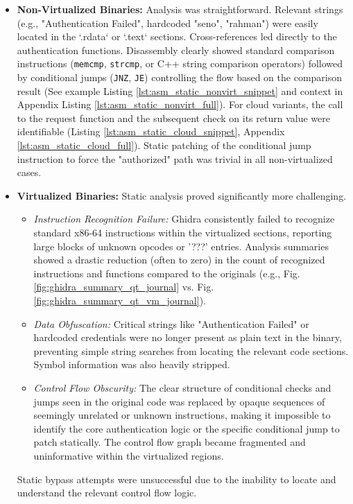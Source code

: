 \begin{itemize}
	\item \textbf{Non-Virtualized Binaries:} Analysis was straightforward. Relevant strings (e.g., "Authentication Failed", hardcoded "seno", "rahman") were easily located in the `.rdata` or `.text` sections. Cross-references led directly to the authentication functions. Disassembly clearly showed standard comparison instructions (\texttt{memcmp}, \texttt{strcmp}, or C++ string comparison operators) followed by conditional jumps (\texttt{JNZ}, \texttt{JE}) controlling the flow based on the comparison result (See example Listing \ref{lst:asm_static_nonvirt_snippet} and context in Appendix Listing \ref{lst:asm_static_nonvirt_full}). For cloud variants, the call to the request function and the subsequent check on its return value were identifiable (Listing \ref{lst:asm_static_cloud_snippet}, Appendix \ref{lst:asm_static_cloud_full}). Static patching of the conditional jump instruction to force the "authorized" path was trivial in all non-virtualized cases.
	\item \textbf{Virtualized Binaries:} Static analysis proved significantly more challenging.
	      \begin{itemize}
		      \item \textit{Instruction Recognition Failure:} Ghidra consistently failed to recognize standard x86-64 instructions within the virtualized sections, reporting large blocks of unknown opcodes or '???' entries. Analysis summaries showed a drastic reduction (often to zero) in the count of recognized instructions and functions compared to the originals (e.g., Fig. \ref{fig:ghidra_summary_qt_journal} vs. Fig. \ref{fig:ghidra_summary_qt_vm_journal}).
		      \item \textit{Data Obfuscation:} Critical strings like "Authentication Failed" or hardcoded credentials were no longer present as plain text in the binary, preventing simple string searches from locating the relevant code sections. Symbol information was also heavily stripped.
		      \item \textit{Control Flow Obscurity:} The clear structure of conditional checks and jumps seen in the original code was replaced by opaque sequences of seemingly unrelated or unknown instructions, making it impossible to identify the core authentication logic or the specific conditional jump to patch statically. The control flow graph became fragmented and uninformative within the virtualized regions.
	      \end{itemize}
	      Static bypass attempts were unsuccessful due to the inability to locate and understand the relevant control flow logic.
\end{itemize}

